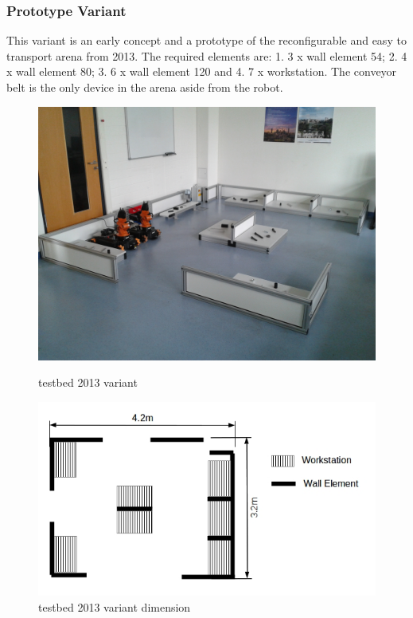 \subsubsection{Prototype Variant}
	This variant is an early concept and a prototype of the reconfigurable and easy to transport arena from 2013. 
	The required elements are: 1. 3 x wall element 54; 2. 4 x wall element 80; 3. 6 x wall element 120 and 4. 7 x workstation.	The conveyor belt is the only device in the arena aside from the robot.
\begin{figure}[htb]
 \begin{center}
 \includegraphics[width=12cm]{./fig/WorkArenaBRSU2013.jpg} 
 \caption{\roaw testbed 2013 variant}
  \label{fig:RoawTestBed2013} 

 \includegraphics[width=12cm]{./fig/WorkArenaBRSU2013Dimension.jpg} 
 \caption{\roaw testbed 2013 variant dimension}
  \label{fig:RoawTestBed2013Dimension} 
   \end{center}
\end{figure}

